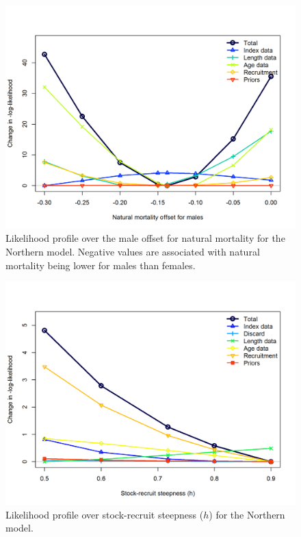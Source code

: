 \documentclass[12pt,]{article}
\begin{document}
\FloatBarrier

\begin{figure}[htbp]
\centering
\includegraphics{Figures/profiles/profile_M2.N.png}
\caption{Likelihood profile over the male offset for natural mortality
for the Northern model. Negative values are associated with natural
mortality being lower for males than females.\label{fig:profile_M2.N}}
\end{figure}

\FloatBarrier

\begin{figure}[htbp]
\centering
\includegraphics{Figures/profiles/profile_h.N.png}
\caption{Likelihood profile over stock-recruit steepness (\(h\)) for the
Northern model. \label{fig:profile_h.N}}
\end{figure}
\end{document}
